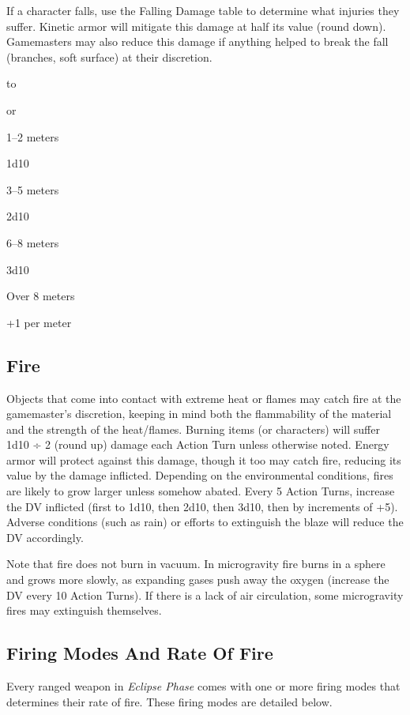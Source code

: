 If a character falls, use the Falling Damage table to 
determine what injuries they suffer. Kinetic armor 
will mitigate this damage at 
half its value (round down). 
Gamemasters may also reduce 
this damage if anything helped 
to break the fall (branches, soft 
surface) at their discretion.

to

or

1–2 meters

1d10

3–5 meters

2d10

6–8 meters

3d10

Over 8 meters

+1 per meter

\subsection{Fire}

Objects that come into contact with extreme heat or 
flames may catch fire at the gamemaster's discretion, 
keeping in mind both the flammability of the material 
and the strength of the heat/flames. Burning items (or 
characters) will suffer 1d10 ÷ 2 (round up) damage 
each Action Turn unless otherwise noted. Energy 
armor will protect against this damage, though it 
too may catch fire, reducing its value by the damage 
inflicted. Depending on the environmental conditions, 
fires are likely to grow larger unless somehow abated. 
Every 5 Action Turns, increase the DV inflicted (first 
to 1d10, then 2d10, then 3d10, then by increments 
of +5). Adverse conditions (such as rain) or efforts to 
extinguish the blaze will reduce the DV accordingly.

Note that fire does not burn in vacuum. In microgravity
fire burns in a sphere and grows more
slowly, as expanding gases push away the oxygen 
(increase the DV every 10 Action Turns). If there is a 
lack of air circulation, some microgravity fires may 
extinguish themselves.

\subsection{Firing Modes And Rate Of Fire}

Every ranged weapon in \textit{Eclipse Phase} comes with one 
or more firing modes that determines their rate of fire. 
These firing modes are detailed below.

